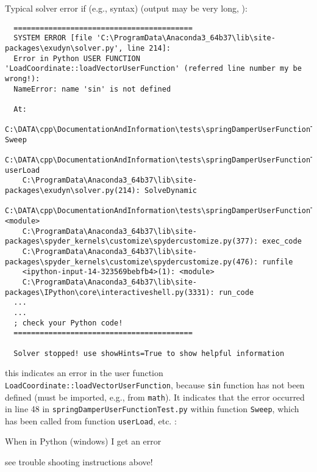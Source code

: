 \ei
\item Typical solver error if (e.g., syntax)  (output may be very long, ):
\begin{lstlisting}
  =========================================
  SYSTEM ERROR [file 'C:\ProgramData\Anaconda3_64b37\lib\site-packages\exudyn\solver.py', line 214]: 
  Error in Python USER FUNCTION 'LoadCoordinate::loadVectorUserFunction' (referred line number my be wrong!):
  NameError: name 'sin' is not defined

  At:
    C:\DATA\cpp\DocumentationAndInformation\tests\springDamperUserFunctionTest.py(48): Sweep
    C:\DATA\cpp\DocumentationAndInformation\tests\springDamperUserFunctionTest.py(54): userLoad
    C:\ProgramData\Anaconda3_64b37\lib\site-packages\exudyn\solver.py(214): SolveDynamic
    C:\DATA\cpp\DocumentationAndInformation\tests\springDamperUserFunctionTest.py(106): <module>
    C:\ProgramData\Anaconda3_64b37\lib\site-packages\spyder_kernels\customize\spydercustomize.py(377): exec_code
    C:\ProgramData\Anaconda3_64b37\lib\site-packages\spyder_kernels\customize\spydercustomize.py(476): runfile
    <ipython-input-14-323569bebfb4>(1): <module>
    C:\ProgramData\Anaconda3_64b37\lib\site-packages\IPython\core\interactiveshell.py(3331): run_code
  ...
  ...
  ; check your Python code!
  =========================================

  Solver stopped! use showHints=True to show helpful information
\end{lstlisting}
\onlyRST{\rstStartNewLine}
%
\bi
\item[$\ra$] this indicates an error in the user function \texttt{LoadCoordinate::loadVectorUserFunction}, because \texttt{sin} function has not been defined (must be imported, e.g., from \texttt{math}). It indicates that the error occurred in line 48 in \texttt{springDamperUserFunctionTest.py} within function \texttt{Sweep}, which has been called from function \texttt{userLoad}, etc.
\ei
\ei \vspace{12pt}
:
\bn
\item When  \codeName in Python (windows) I get an error 
\bi
\item[$\ra$] see trouble shooting instructions above!
